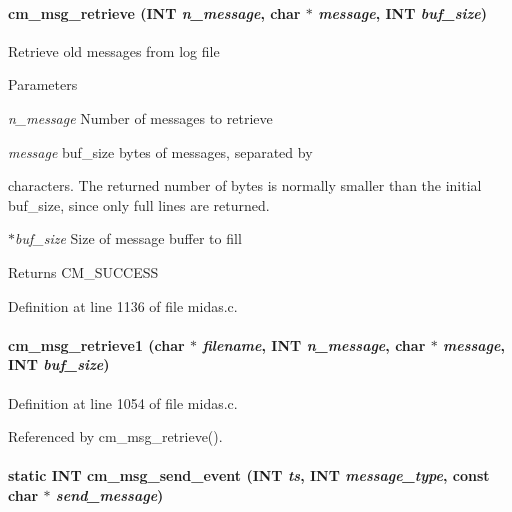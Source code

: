 \paragraph[{cm\_\-msg\_\-retrieve}]{ cm\_\-msg\_\-retrieve ({\bf INT} {\em n\_\-message}, \/  char $\ast$ {\em message}, \/  {\bf INT} {\em buf\_\-size})}\hfill\label{group__msgfunctionc_gad92636d84ec9438a25ca6b17c4e6760d}
Retrieve old messages from log file 
\begin{DoxyParams}{Parameters}
\item[{\em n\_\-message}]Number of messages to retrieve \item[{\em message}]buf\_\-size bytes of messages, separated by \par
 characters. The returned number of bytes is normally smaller than the initial buf\_\-size, since only full lines are returned. \item[{\em $\ast$buf\_\-size}]Size of message buffer to fill \end{DoxyParams}
\begin{DoxyReturn}{Returns}
CM\_\-SUCCESS 
\end{DoxyReturn}


Definition at line 1136 of file midas.c.
\paragraph[{cm\_\-msg\_\-retrieve1}]{ cm\_\-msg\_\-retrieve1 (char $\ast$ {\em filename}, \/  {\bf INT} {\em n\_\-message}, \/  char $\ast$ {\em message}, \/  {\bf INT} {\em buf\_\-size})}\hfill\label{group__msgfunctionc_ga489f76d96b5d217fab6da7405ab559f8}


Definition at line 1054 of file midas.c.

Referenced by cm\_\-msg\_\-retrieve().
\paragraph[{cm\_\-msg\_\-send\_\-event}]{\setlength{\rightskip}{0pt plus 5cm}static {\bf INT} cm\_\-msg\_\-send\_\-event ({\bf INT} {\em ts}, \/  {\bf INT} {\em message\_\-type}, \/  const char $\ast$ {\em send\_\-message})}\hfill\label{group__msgfunctionc_ga3f13bc780b6031ab92b5d602a7d97bcd}


